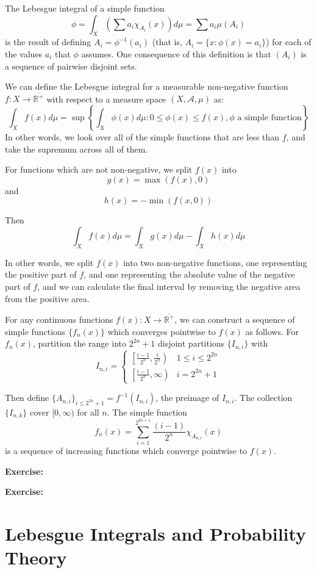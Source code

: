 \documentclass{article}
\begin{document}
The Lebesgue integral of a simple function
\[\phi = \int_X \left( \sum a_i \chi_{A_i}(x)\right) d\mu = \sum a_i \mu(A_i) \]
is the result of defining $A_i = \phi^{-1}(a_i)$ (that is,
$A_i = \{x:\phi(x)=a_i\}$) for each of the values $a_i$ that $\phi$ assumes. One consequence
of this definition is that $\left(A_i\right)$ is a sequence of pairwise disjoint sets.

We can define the Lebesgue integral for a measurable non-negative function $f:X \rightarrow 
\overline{\mathbb{R}^{+}}$ with respect to a measure space $(X, \mathcal{A},\mu)$ as:
\[ \int_X f(x) d\mu = \sup\left\{\int_X \phi(x) d\mu: 0 \le \phi(x) \le f(x), \phi \textrm{ a
simple function} \right\} \]
In other words, we look over all of the simple functions that are less than $f$, and take
the supremum across all of them.

For functions which are not non-negative, we split $f(x)$ into
\[ g(x) = \max(f(x),0) \]
and
\[ h(x) = - \min(f(x,0)) \]

Then 
\[\int_X f(x) d\mu = \int_X g(x) d\mu - \int_X h(x) d\mu \]

In other words, we split $f(x)$ into two non-negative functions, one representing the positive
part of $f$, and one representing the absolute value of the negative part of $f$, and we can
calculate the final interval by removing the negative area from the positive area.

For any continuous functions $f(x): X \rightarrow \overline{\mathbb{R}^{+}}$, we can construct
a sequence of simple functions $\{f_n(x)\}$ which converges pointwise to $f(x)$ as follows.
For $f_n(x)$, partition the range into $2^{2n}+1$ disjoint partitions $\{I_{n,i}\}$ with 
\[ I_{n,i}  = \left\{ 
\begin{array}{ll}
	\left[\frac{i-1}{2^n},\frac{i}{2^n}\right) & 1 \le i \le 2^{2n} \\[2pt]
	\left[\frac{i-1}{2^n},\infty\right) & i=2^{2n} + 1 
\end{array} \right. \]

Then define $\{A_{n,i}\}_{i \le 2^{2n} + 1} = f^{-1}(I_{n,i})$, the preimage of $I_{n,i}$.
The collection $\{I_{n,k}\}$ cover $[0,\infty)$ for all $n$. The simple function 
\[ f_n(x) = \sum_{i=1}^{2^{2n+1}}\frac{(i-1)}{2^n}\chi_{A_{n,i}}(x) \]
is a sequence of increasing functions which converge pointwise to $f(x)$.


\textbf{Exercise:}

\textbf{Exercise:}


\section{Lebesgue Integrals and Probability Theory}
\end{document}
